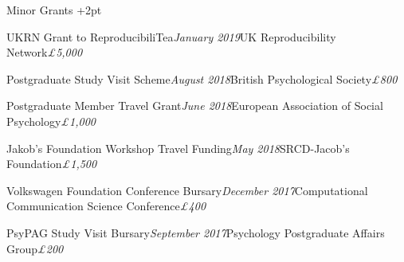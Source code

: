 \documentclass{resume} %
\begin{document}
\begin{rSection}{Minor Grants}  \itemsep +2pt
\begin{rSubsection}{UKRN Grant to ReproducibiliTea}{\em January 2019}{UK Reproducibility Network}{\hfill {\em \pounds 5,000}}
\item[]\vspace{-1.5\baselineskip}
\end{rSubsection}


\begin{rSubsection}{Postgraduate Study Visit Scheme}{\em August 2018}{British Psychological Society}{\hfill {\em \pounds 800}}
\item[]\vspace{-1.5\baselineskip}
\end{rSubsection}

\begin{rSubsection}{Postgraduate Member Travel Grant}{\em June 2018}{European Association of Social Psychology}{\hfill {\em \pounds 1,000}}
\item[]\vspace{-1.5\baselineskip}
\end{rSubsection}

\begin{rSubsection}{Jakob’s Foundation Workshop Travel Funding}{\em May 2018}{SRCD-Jacob's Foundation}{\hfill {\em \pounds 1,500}}
\item[]\vspace{-1.5\baselineskip}
\end{rSubsection}

\begin{rSubsection}{Volkswagen Foundation Conference Bursary}{\em December 2017}{Computational Communication Science Conference}{\hfill {\em \pounds 400}}
\item[]\vspace{-1.5\baselineskip}
\end{rSubsection}

\begin{rSubsection}{PsyPAG Study Visit Bursary}{\em September 2017}{Psychology Postgraduate Affairs Group}{\hfill {\em \pounds 200}}
\item[]\vspace{-1.5\baselineskip}
\end{rSubsection}


\end{rSection}
\end{document}
